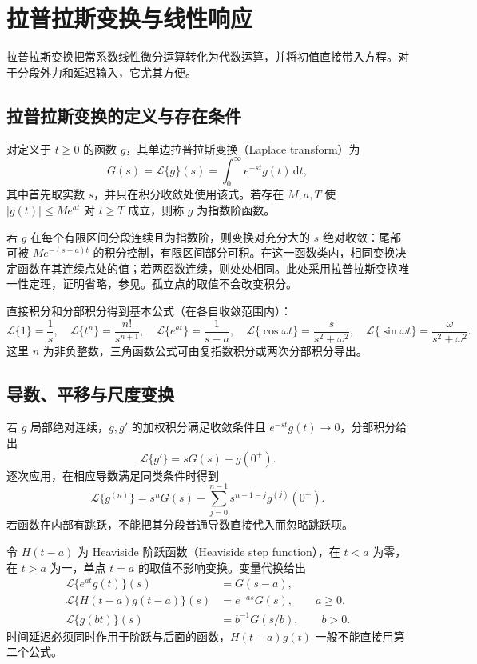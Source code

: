 \setcounter{chapter}{10} %
\chapter{拉普拉斯变换与线性响应}
\label{chap:ode-laplace}

拉普拉斯变换把常系数线性微分运算转化为代数运算，并将初值直接带入方程。对于分段外力和延迟输入，它尤其方便。

\section{拉普拉斯变换的定义与存在条件}
\begin{definition}
对定义于 $t\geq0$ 的函数 $g$，其单边拉普拉斯变换（Laplace transform）为
\[
 G(s)=\mathcal L\{g\}(s)=\int_0^\infty e^{-st}g(t)\,\mathrm dt,
\]
其中首先取实数 $s$，并只在积分收敛处使用该式。若存在 $M,a,T$ 使 $|g(t)|\leq Me^{at}$ 对 $t\geq T$ 成立，则称 $g$ 为指数阶函数。
\end{definition}

若 $g$ 在每个有限区间分段连续且为指数阶，则变换对充分大的 $s$ 绝对收敛：尾部可被 $Me^{-(s-a)t}$ 的积分控制，有限区间部分可积。在这一函数类内，相同变换决定函数在其连续点处的值；若两函数连续，则处处相同。此处采用拉普拉斯变换唯一性定理，证明省略，参见\cite[第6章]{lebl-diffyqs}。孤立点的取值不会改变积分。

直接积分和分部积分得到基本公式（在各自收敛范围内）：
\[
 \mathcal L\{1\}=\frac1s,\quad
 \mathcal L\{t^n\}=\frac{n!}{s^{n+1}},\quad
 \mathcal L\{e^{at}\}=\frac1{s-a},\quad
 \mathcal L\{\cos\omega t\}=\frac{s}{s^2+\omega^2},\quad
 \mathcal L\{\sin\omega t\}=\frac{\omega}{s^2+\omega^2}.
\]
这里 $n$ 为非负整数，三角函数公式可由复指数积分或两次分部积分导出。

\section{导数、平移与尺度变换}
若 $g$ 局部绝对连续，$g,g'$ 的加权积分满足收敛条件且 $e^{-st}g(t)\to0$，分部积分给出
\[
 \mathcal L\{g'\}=sG(s)-g(0^+).
\]
逐次应用，在相应导数满足同类条件时得到
\begin{equation}
 \mathcal L\{g^{(n)}\}=s^nG(s)-\sum_{j=0}^{n-1}s^{n-1-j}g^{(j)}(0^+).
 \label{eq:ode-laplace-derivative}
\end{equation}
若函数在内部有跳跃，不能把其分段普通导数直接代入而忽略跳跃项。

令 $H(t-a)$ 为 Heaviside 阶跃函数（Heaviside step function），在 $t<a$ 为零，在 $t>a$ 为一，单点 $t=a$ 的取值不影响变换。变量代换给出
\begin{align*}
 \mathcal L\{e^{at}g(t)\}(s)&=G(s-a),\\
 \mathcal L\{H(t-a)g(t-a)\}(s)&=e^{-as}G(s),\qquad a\geq0,\\
 \mathcal L\{g(bt)\}(s)&=b^{-1}G(s/b),\qquad b>0.
\end{align*}
时间延迟必须同时作用于阶跃与后面的函数，$H(t-a)g(t)$ 一般不能直接用第二个公式。

